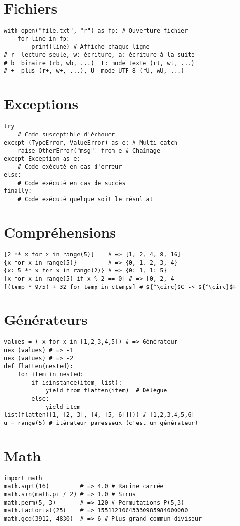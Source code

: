 \documentclass{article}
\begin{document}
\begin{multicols*}{4}
\section*{Fichiers}
\begin{lstlisting}
with open("file.txt", "r") as fp: # Ouverture fichier
    for line in fp:
        print(line) # Affiche chaque ligne
# r: lecture seule, w: écriture, a: écriture à la suite
# b: binaire (rb, wb, ...), t: mode texte (rt, wt, ...)
# +: plus (r+, w+, ...), U: mode UTF-8 (rU, wU, ...)
\end{lstlisting}

\section*{Exceptions}
\begin{lstlisting}
try:
    # Code susceptible d'échouer
except (TypeError, ValueError) as e: # Multi-catch
    raise OtherError("msg") from e # Chaînage
except Exception as e:
    # Code exécuté en cas d'erreur
else:
    # Code exécuté en cas de succès
finally:
    # Code exécuté quelque soit le résultat
\end{lstlisting}

\section*{Compréhensions}
\begin{lstlisting}[mathescape]
[2 ** x for x in range(5)]    # => [1, 2, 4, 8, 16]
{x for x in range(5)}         # => {0, 1, 2, 3, 4}
{x: 5 ** x for x in range(2)} # => {0: 1, 1: 5}
[x for x in range(5) if x % 2 == 0] # => [0, 2, 4]
[(temp * 9/5) + 32 for temp in ctemps] # ${^\circ}$C -> ${^\circ}$F
\end{lstlisting}

\section*{Générateurs}
\begin{lstlisting}
values = (-x for x in [1,2,3,4,5]) # => Générateur
next(values) # => -1
next(values) # => -2
def flatten(nested):
    for item in nested:
        if isinstance(item, list):
            yield from flatten(item)  # Délègue
        else:
            yield item
list(flatten([1, [2, 3], [4, [5, 6]]])) # [1,2,3,4,5,6]
u = range(5) # itérateur paresseux (c'est un générateur)
\end{lstlisting}

\section*{Math}
\begin{lstlisting}
import math
math.sqrt(16)         # => 4.0 # Racine carrée
math.sin(math.pi / 2) # => 1.0 # Sinus
math.perm(5, 3)       # => 120 # Permutations P(5,3)
math.factorial(25)    # => 15511210043330985984000000
math.gcd(3912, 4830)  # => 6 # Plus grand commun diviseur
\end{lstlisting}


\end{multicols*}
\end{document}
